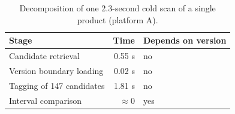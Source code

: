 \begin{table}[htbp]
\centering
\caption{Decomposition of one 2.3-second cold scan of a single product (platform A).}
\label{tab:single-product}
\footnotesize
\begin{tabular}{l r l}
\hline
Stage & Time & Depends on version \\
\hline
Candidate retrieval & 0.55 s & no \\
Version boundary loading & 0.02 s & no \\
Tagging of 147 candidates & 1.81 s & no \\
Interval comparison & $\approx 0$ & yes \\
\hline
\end{tabular}
\end{table}
